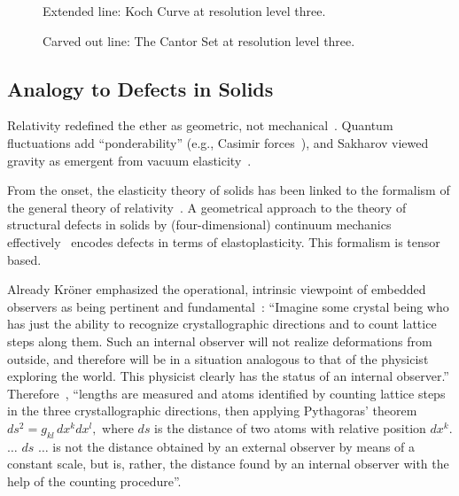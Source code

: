 \documentclass[%
  reprint,
  superscriptaddress,
  showpacs,
  showkeys,
  amsmath,amssymb,
  pra,
  longbibliography,
  floatfix,
]{revtex4-2}
\begin{document}
\begin{figure}[ht]
\centering
{}
\caption{Extended line: Koch Curve at resolution level three.}
\label{fig:Koch}
\end{figure}


\begin{figure}[ht]
\centering
{}
\caption{Carved out line:  The Cantor Set at resolution level three.}
\label{fig:Cantor}
\end{figure}


\subsection{Analogy to Defects in Solids}
Relativity redefined the ether as geometric, not mechanical~\cite{einstein-aether-en}. Quantum fluctuations add ``ponderability'' (e.g., Casimir forces~\cite{Casimir_1948}), and Sakharov viewed gravity as emergent from vacuum elasticity~\cite{Sakharov-67}.

From the onset, the elasticity theory of solids has been linked to the formalism of the general theory of relativity~\cite{schaefer-1953,zaanen-2022}.
A geometrical approach to the theory of structural defects in solids by (four-dimensional)
continuum mechanics~\cite{Kroner-1958,kroner-1959,Kosevich-1962,Turski-66,kroner-1967,kroner-1975,Kossecka_deWit-77,kroner-1985,kroner-1990,kroner-2001,amari-1968,gunther-1972,Guenther-1979,gunther-1981,gunther-1983,golebiewska-lasota-1979a,golebiewska-lasota-1979b}
effectively~\cite{anderson:73} encodes defects in terms of  elastoplasticity.
This formalism is tensor based.

Already Kr\"oner emphasized the
operational, intrinsic viewpoint of embedded observers as being pertinent and fundamental~\cite{kroner-1990}:
``Imagine some crystal being who has just the ability to recognize
crystallographic directions and to count lattice steps along them. Such an
internal observer will not realize deformations from outside, and therefore
will be in a situation analogous to that of the physicist exploring the world.
This physicist clearly has the status of an internal observer.''
Therefore~\cite{kroner-1985}, ``lengths are measured and atoms identified by
counting lattice steps in the three crystallographic directions, then applying Pythagoras' theorem
$
ds^2 = g_{kl}\, dx^k dx^l,
$
where $ds$ is the distance of two atoms with relative position $dx^k$.
$\ldots$
$ds$ $\ldots$ is not the distance obtained by
an external observer by means of a constant scale, but is, rather, the distance found
by an internal observer with the help of the counting procedure''.
\end{document}
